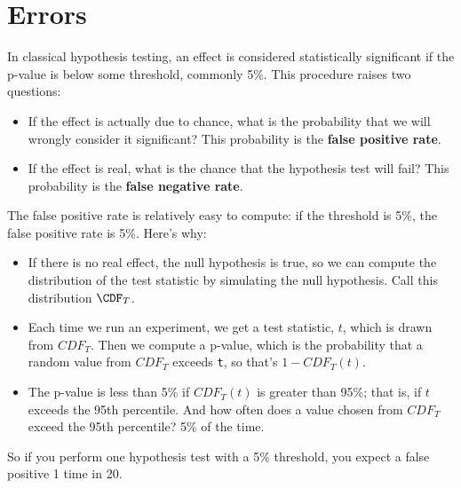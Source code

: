 \section{Errors}

In classical hypothesis testing, an effect is considered statistically
significant if the p-value is below some threshold, commonly 5\%.
This procedure raises two questions:
 

\begin{itemize}

\item If the effect is actually due to chance, what is the probability
that we will wrongly consider it significant?  This
probability is the {\bf false positive rate}.

\item If the effect is real, what is the chance that the hypothesis
test will fail?  This probability is the {\bf false negative rate}.

\end{itemize}

The false positive rate is relatively easy to compute: if the
threshold is 5\%, the false positive rate is 5\%.  Here's why:

\begin{itemize}

\item If there is no real effect, the null hypothesis is true, so we
  can compute the distribution of the test statistic by simulating the
  null hypothesis.  Call this distribution $\CDF_T$.

\item Each time we run an experiment, we get a test statistic, $t$,
  which is drawn from $CDF_T$.  Then we compute a p-value, which is
  the probability that a random value from $CDF_T$ exceeds {\tt t},
  so that's $1 - CDF_T(t)$.

\item The p-value is less than 5\% if $CDF_T(t)$ is greater
  than 95\%; that is, if $t$ exceeds the 95th percentile.
  And how often does a value chosen from $CDF_T$ exceed
  the 95th percentile?  5\% of the time.

\end{itemize}

So if you perform one hypothesis test with a 5\% threshold, you expect
a false positive 1 time in 20.


